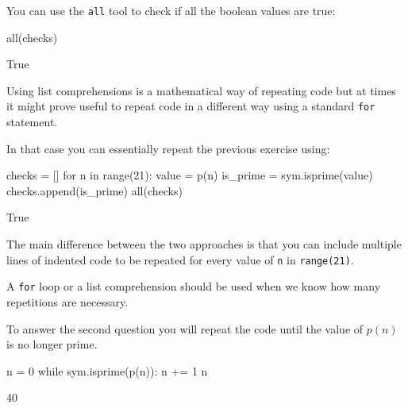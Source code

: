 You can use the \texttt{all} tool to check if all the boolean values are true:




\begin{pyin}
all(checks)
\end{pyin}





\begin{raw}
True
\end{raw}

\begin{note}
Using list comprehensions is a mathematical way of repeating code but at times
it might prove useful to repeat code in a different way using a standard \texttt{for}
statement.
\end{note}



In that case you can essentially repeat the previous exercise using:

\begin{pyin}
checks = []
for n in range(21):
    value = p(n)
    is_prime = sym.isprime(value)
    checks.append(is_prime)
all(checks)
\end{pyin}





\begin{raw}
True
\end{raw}





The main difference between the two approaches is that you can include multiple
lines of indented code to be repeated for every value of \texttt{n} in
\texttt{range(21)}.


\begin{note}
A \texttt{for} loop or a list comprehension should be used when we know how many
repetitions are necessary.
\end{note}



To answer the second question you will repeat the code until the value of \(p(n)\)
is no longer prime.




\begin{pyin}
n = 0
while sym.isprime(p(n)):
    n += 1
n
\end{pyin}





\begin{raw}
40
\end{raw}


